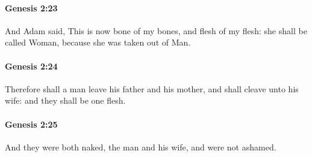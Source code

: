 		\paragraph{Genesis 2:23} %
			\label{GENESIS-2-23}

			And Adam said, This is now bone of my bones, and flesh of my flesh: she shall be called Woman, because she was taken out of Man.


		\paragraph{Genesis 2:24} %
			\label{GENESIS-2-24}

			Therefore shall a man leave his father and his mother, and shall cleave unto his wife: and they shall be one flesh.


		\paragraph{Genesis 2:25} %
			\label{GENESIS-2-25}

			And they were both naked, the man and his wife, and were not ashamed.


